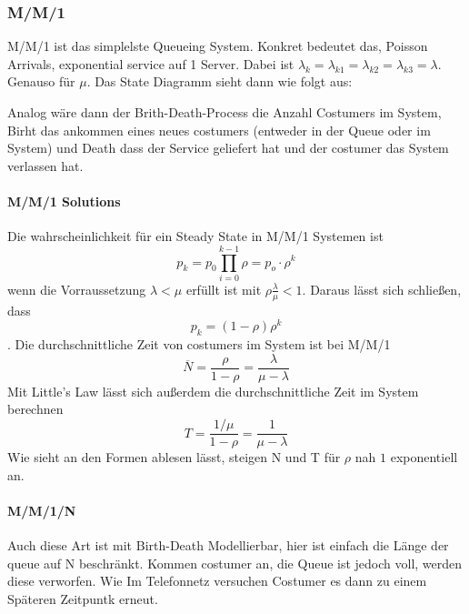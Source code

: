 		\subsubsection{M/M/1}
			M/M/1 ist das simplelste Queueing System. Konkret bedeutet das, Poisson Arrivals, exponential service auf 1 Server. Dabei ist $\lambda_k = \lambda_{k1} = \lambda_{k2} = \lambda_{k3} = \lambda$. Genauso für $\mu$. Das State Diagramm sieht dann wie folgt aus:
			\begin{center}
			\end{center} 
			Analog wäre dann der Brith-Death-Process die Anzahl Costumers im System, Birht das ankommen eines neues costumers (entweder in der Queue oder im System) und Death dass der Service geliefert hat und der costumer das System verlassen hat. 

			\paragraph{M/M/1 Solutions}
				Die wahrscheinlichkeit für ein Steady State in M/M/1 Systemen ist 
				$$
					p_k = p_0\prod_{i = 0}^{k-1}\rho = p_o \cdot \rho^k  
				$$
				wenn die Vorraussetzung $\lambda < \mu$ erfüllt ist mit $\rho \frac{\lambda}{\mu} <1$. Daraus lässt sich schließen, dass 
				$$
					p_k=(1-\rho)\rho^k
				$$.
				Die durchschnittliche Zeit von costumers im System ist bei M/M/1 
				$$
					\overline{N}=\frac{\rho}{1-\rho}=\frac{\lambda}{\mu-\lambda}
				$$
				Mit Little's Law lässt sich außerdem die durchschnittliche Zeit im System berechnen
				$$
					T=\frac{1/\mu}{1-\rho}=\frac{1}{\mu-\lambda}
				$$
				Wie sieht an den Formen ablesen lässt, steigen N und T für $\rho$ nah $1$ exponentiell an. 

			\paragraph{M/M/1/N}
				Auch diese Art ist mit Birth-Death Modellierbar, hier ist einfach die Länge der queue auf N beschränkt. Kommen costumer an, die Queue ist jedoch voll, werden diese verworfen. Wie Im Telefonnetz versuchen Costumer es dann zu einem Späteren Zeitpuntk erneut.
